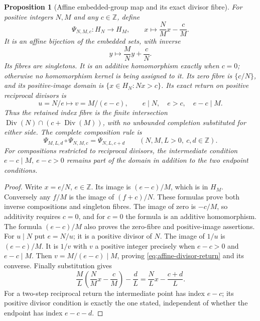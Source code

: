 \documentclass[11pt]{article}
\newtheorem{proposition}[theorem]{Proposition}
\theoremstyle{definition}\newtheorem{definition}[theorem]{Definition}
\theoremstyle{remark}\newtheorem{remark}[theorem]{Remark}
\DeclareMathOperator{\Div}{Div}
\newcommand{\Z}{\mathbb Z}\newcommand{\Q}{\mathbb Q}
\begin{document}
\begin{proposition}[Affine embedded-group map and its exact divisor fibre]
\label{prop:affine-point}
For positive integers \(N,M\) and any \(c\in\Z\), define
\[
 \Psi_{N,M,c}:H_N\longrightarrow H_M,\qquad
 x\longmapsto\frac NM x-\frac cM .
\]
It is an affine bijection of the embedded sets, with inverse
\[
 y\longmapsto\frac MN y+\frac cN.
\]
Its fibres are singletons.  It is an additive homomorphism
exactly when \(c=0\); otherwise no homomorphism kernel
is being assigned to it.  Its zero fibre is \(\{c/N\}\),
and its positive-image domain is
\(\{x\in H_N:Nx>c\}\).  Its exact return on positive
reciprocal divisors is
\begin{equation}\label{eq:affine-divisor-return}
 u=N/e\longmapsto v=M/(e-c),\qquad
 e\mid N,\quad e>c,\quad e-c\mid M.
\end{equation}
Thus the retained index fibre is the finite intersection
\(\Div(N)\cap(c+\Div(M))\), with no unbounded
completion substituted for either side.  The complete
composition rule is
\[
 \Psi_{M,L,d}\circ\Psi_{N,M,c}=\Psi_{N,L,c+d}
 \qquad(N,M,L>0,\ c,d\in\Z).
\]
For compositions restricted to reciprocal divisors,
the intermediate condition \(e-c\mid M,\ e-c>0\)
remains part of the domain in addition to the two
endpoint conditions.
\end{proposition}
\begin{proof}
Write \(x=e/N\), \(e\in\Z\).  Its image is
\((e-c)/M\), which is in \(H_M\).  Conversely any
\(f/M\) is the image of \((f+c)/N\).  These formulas
prove both inverse compositions and singleton fibres.
The image of zero is \(-c/M\), so additivity
requires \(c=0\), and for \(c=0\) the formula is
an additive homomorphism.  The formula \((e-c)/M\)
also proves the zero-fibre and positive-image assertions.
For \(u\mid N\) put \(e=N/u\); it is a positive
divisor of \(N\).  The image of \(1/u\) is
\((e-c)/M\).  It is \(1/v\) with \(v\) a positive
integer precisely when \(e-c>0\) and \(e-c\mid M\).
Then \(v=M/(e-c)\mid M\), proving
\eqref{eq:affine-divisor-return} and its converse.
Finally substitution gives
\[
 \frac ML\left(\frac NM x-\frac cM\right)-\frac dL
       =\frac NLx-\frac{c+d}{L}.
\]
For a two-step reciprocal return the intermediate
point has index \(e-c\); its positive divisor
condition is exactly the one stated, independent
of whether the endpoint has index \(e-c-d\).
\end{proof}
\end{document}

